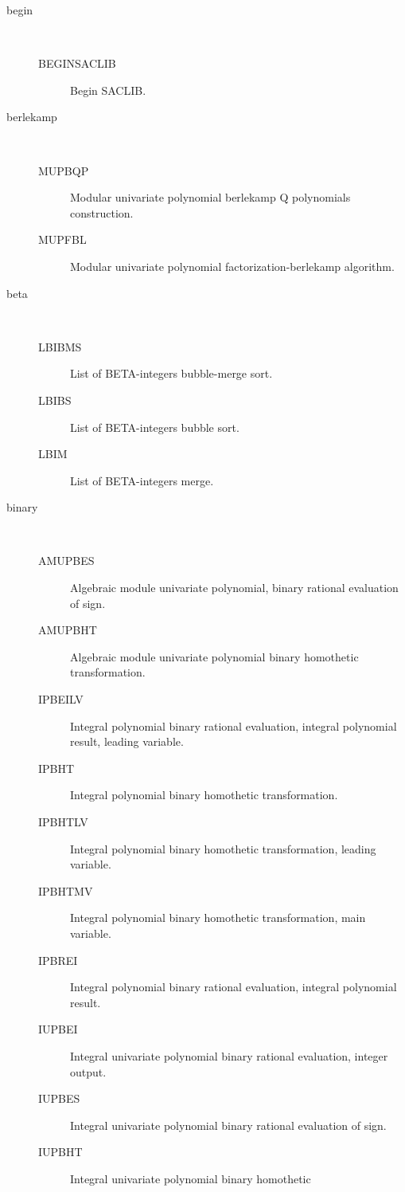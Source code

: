 \begin{description}
\begin{description}
  \end{description}
\item[begin] \ \ 
  \begin{description}
  \item[BEGINSACLIB]  Begin SACLIB.
  \end{description}
\item[berlekamp] \ \ 
  \begin{description}
  \item[MUPBQP]  Modular univariate polynomial berlekamp Q polynomials
    construction.
  \item[MUPFBL]  Modular univariate polynomial factorization-berlekamp
    algorithm.
  \end{description}
\item[beta] \ \ 
  \begin{description}
  \item[LBIBMS]  List of BETA-integers bubble-merge sort.
  \item[LBIBS]  List of BETA-integers bubble sort.
  \item[LBIM]  List of BETA-integers merge.
  \end{description}
\item[binary] \ \ 
  \begin{description}
  \item[AMUPBES]  Algebraic module univariate polynomial, binary rational
    evaluation of sign.
  \item[AMUPBHT]  Algebraic module univariate polynomial binary homothetic
    transformation.
  \item[IPBEILV]  Integral polynomial binary rational evaluation, integral
    polynomial result, leading variable.
  \item[IPBHT]  Integral polynomial binary homothetic transformation.
  \item[IPBHTLV]  Integral polynomial binary homothetic transformation,
    leading variable.
  \item[IPBHTMV]  Integral polynomial binary homothetic transformation, main
    variable.
  \item[IPBREI]  Integral polynomial binary rational evaluation, integral
    polynomial result.
  \item[IUPBEI]  Integral univariate polynomial binary rational evaluation,
    integer output.
  \item[IUPBES]  Integral univariate polynomial binary rational evaluation of
    sign.
  \item[IUPBHT]  Integral univariate polynomial binary homothetic

\end{description}
\end{description}
